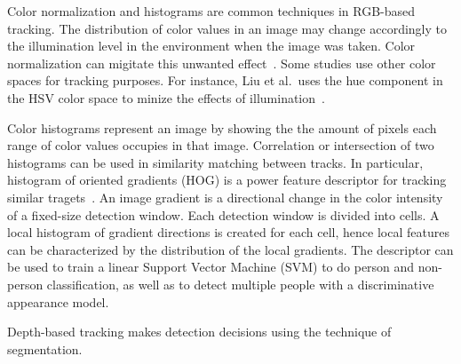 Color normalization and histograms are common techniques in RGB-based tracking. The distribution of color values in an image may change accordingly to the illumination level in the environment when the image was taken. Color normalization can migitate this unwanted effect~\cite{reinhard_color_transfers}. Some studies use other color spaces for tracking purposes. For instance, Liu et al.\ uses the hue component in the HSV color space to minize the effects of illumination~\cite{liu_tracking_with_pei}.

Color histograms represent an image by showing the the amount of pixels each range of color values occupies in that image. Correlation or intersection of two histograms can be used in similarity matching between tracks. In particular, histogram of oriented gradients (HOG) is a power feature descriptor for tracking similar tragets~\cite{dalal_hog, dollar_pedestrian_detection, munaro_tracking_within_groups_with_mobile_robot, luber_rgbd_boosted_models}. An image gradient is a directional change in the color intensity of a fixed-size detection window. Each detection window is divided into cells. A local histogram of gradient directions is created for each cell, hence local features can be characterized by the distribution of the local gradients. The descriptor can be used to train a linear Support Vector Machine (SVM) to do person and non-person classification, as well as to detect multiple people with a discriminative appearance model.

Depth-based tracking makes detection decisions using the technique of segmentation. 




